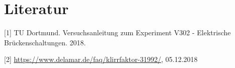 \section{Literatur}

[1] TU Dortmund. Versuchsanleitung zum Experiment V302 - Elektrische Brückenschaltungen. 2018.

[2] \url{https://www.delamar.de/faq/klirrfaktor-31992/}, 05.12.2018
